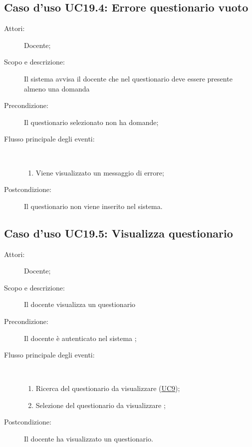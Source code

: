 \subsection{Caso d'uso UC19.4: Errore questionario vuoto}\begin{description}
	\item[Attori:] Docente;
	\item[Scopo e descrizione:] Il sistema avvisa il docente che nel questionario deve essere presente almeno una domanda
	\item[Precondizione:] Il questionario selezionato non ha domande;
	
	\item[Flusso principale degli eventi:] \ 
	\begin{enumerate}
		\item Viene visualizzato un messaggio di errore;
		
	\end{enumerate}
	\item[Postcondizione:] Il questionario non viene inserito nel sistema.
\end{description}
\hypertarget{UC19.5}{}
\subsection{Caso d'uso UC19.5: Visualizza questionario}\begin{description}
	\item[Attori:] Docente;
	\item[Scopo e descrizione:] Il docente visualizza un questionario
	\item[Precondizione:] Il docente è autenticato nel sistema
	;
	
	\item[Flusso principale degli eventi:] \ 
	\begin{enumerate}
		\item Ricerca del questionario da visualizzare	 (\hyperlink{UC9}{UC9});
		\item Selezione del questionario da visualizzare	;
		
	\end{enumerate}
	\item[Postcondizione:] Il docente ha visualizzato un questionario.
\end{description}
\hypertarget{UC20}{}
